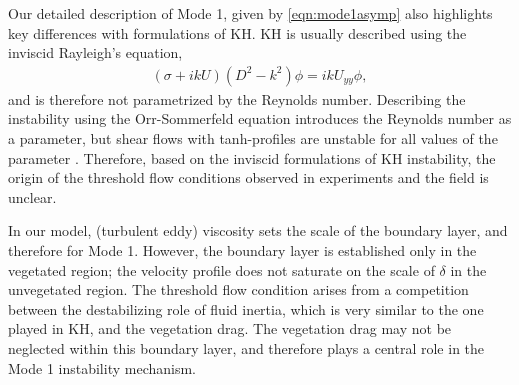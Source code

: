 \documentclass{jfm}
\renewcommand{\Rey}{{R}}
\newcommand{\Ndg}{\tilde{N}_g}
\begin{document}
Our detailed description of Mode 1, given by \eqref{eqn:mode1asymp} also highlights key differences with formulations of KH. 
KH is usually described using the inviscid Rayleigh's equation, 
\begin{align}
\left(\sigma+ikU\right) \left(D^2-k^2\right)\phi =  ikU_{yy}\phi, 
\label{eqn:Rayleigh}
\end{align}
and is therefore not parametrized by the Reynolds number.
Describing the instability using the Orr-Sommerfeld equation introduces the Reynolds number as a parameter, but shear flows with tanh-profiles are unstable for all values of the parameter \citep{Drazin81}.
Therefore, based on the inviscid formulations of KH instability, the origin of the threshold flow conditions observed in experiments and the field is unclear.

In our model, (turbulent eddy) viscosity sets the scale of the boundary layer, and therefore for Mode 1.
However, the boundary layer is established only in the vegetated region; the velocity profile does not saturate on the scale of $\delta$ in the unvegetated region.
The threshold flow condition arises from a competition between the destabilizing role of fluid inertia, which is very similar to the one played in KH, and the vegetation drag.
The vegetation drag may not be neglected within this boundary layer, and therefore plays a central role in the Mode 1 instability mechanism.

\end{document}
